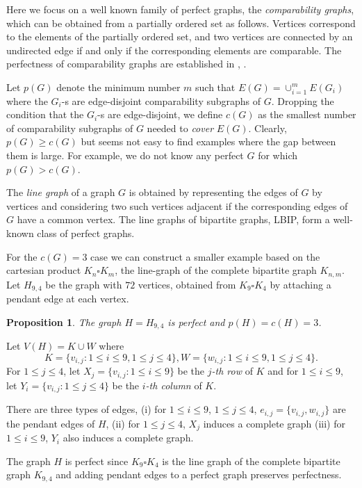 \documentclass[10pt,a4paper]{article}
\newtheorem{proposition}[theorem]{Proposition}
\begin{document}
Here we focus on a well known family of perfect graphs, the {\em comparability graphs},
which can be obtained from a partially ordered set as follows.
Vertices correspond to the elements of the partially ordered set,
and two vertices are connected by an undirected edge if and only if the corresponding elements
are comparable. The perfectness of comparability graphs are established in \cite{D50}, \cite{M71}.

Let $p(G)$ denote the minimum number $m$ such that $E(G)=\cup_{i=1}^m E(G_i)$ where the $G_i$-s are edge-disjoint comparability subgraphs of $G$.
Dropping  the condition that the $G_i$-s are edge-disjoint, we define $c(G)$ as the smallest number of comparability subgraphs of $G$ needed to {\em cover} $E(G)$.
Clearly, $p(G)\ge c(G)$ but seems not easy to find examples where the gap between them is large. For example, we do not know any perfect $G$ for which $p(G)>c(G)$.

The {\em line graph} of a graph $G$ is obtained by representing the edges of $G$ by vertices and
considering two such vertices adjacent if the corresponding edges of $G$ have a common vertex.
The line graphs of bipartite graphs, LBIP, form a well-known class of perfect graphs.

For the $c(G)=3$ case we can construct a smaller
example  based on the cartesian product  $K_n\square K_m$, the line-graph of the complete bipartite graph $K_{n,m}$.
Let $H_{9,4}$ be the graph with $72$ vertices,
obtained from $K_9\square K_4$ by attaching a pendant edge at each vertex.

\begin{proposition}\label{H9} The graph $H=H_{9,4}$ is perfect and $p(H)=c(H)=3$.
\end{proposition}




Let $V(H)=K\cup W$ where
$$K=\{v_{i,j}: 1\le i\le 9, 1\le j\le 4\}, W=\{w_{i,j}:  1\le i\le 9, 1\le j\le 4\}.$$
For $1\le j\le 4$, let $X_j=\{v_{i, j} : 1\le i \le 9\}$ be the {\em $j$-th row} of $K$ and
for  $1\le i\le 9$, let $Y_i=\{v_{i, j} : 1\le j \le 4\}$ be the {\em $i$-th column} of $K$.

There are three types of edges,
(i)  for  $1\le i\le 9$, $1\le j\le 4$,  $e_{i,j}=\{v_{i,j},w_{i,j}\}$ are the pendant edges of $H$,
(ii) for $1\le j\le 4$, $X_j$ induces a complete graph
(iii)  for $1\le i\le 9$, $Y_i$ also induces a complete graph.

  The graph $H$ is perfect since $K_9\square K_4$ is the line graph of the complete bipartite graph
  $K_{9,4}$ and adding pendant edges to a perfect graph preserves perfectness.
\end{document}
